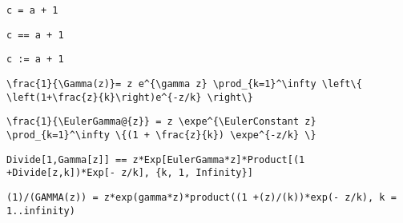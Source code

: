 \newsavebox\BOST
\begin{lrbox}{\BOST}
 \begin{minipage}[t]{0.82\textwidth}
  \lstinline[language={[latex]TeX},mathescape,breaklines=true]"c = a + 1"
 \end{minipage}
\end{lrbox}
\newsavebox\BOMM
\begin{lrbox}{\BOMM}
 \begin{minipage}[t]{0.82\textwidth}
  \lstinline[language={[latex]TeX},mathescape,breaklines=true]"c == a + 1"
 \end{minipage}
\end{lrbox}
\newsavebox\BOMA
\begin{lrbox}{\BOMA}
 \begin{minipage}[t]{0.82\textwidth}
  \lstinline[language={[latex]TeX},mathescape,breaklines=true]"c := a + 1"
 \end{minipage}
\end{lrbox}
\newsavebox\BPT
\begin{lrbox}{\BPT}
 \begin{minipage}[t]{0.82\textwidth}
  \lstinline[language={[latex]TeX},mathescape,breaklines=true]"\frac{1}{\Gamma(z)}= z e^{\gamma z} \prod_{k=1}^\infty \left\{ \left(1+\frac{z}{k}\right)e^{-z/k} \right\}"
 \end{minipage}
\end{lrbox}
\newsavebox\BPST
\begin{lrbox}{\BPST}
 \begin{minipage}[t]{0.82\textwidth}
  \lstinline[language={[latex]TeX},mathescape,breaklines=true]"\frac{1}{\EulerGamma@{z}} = z \expe^{\EulerConstant z} \prod_{k=1}^\infty \{(1 + \frac{z}{k}) \expe^{-z/k} \}"
 \end{minipage}
\end{lrbox}
\newsavebox\BPMM
\begin{lrbox}{\BPMM}
 \begin{minipage}[t]{0.82\textwidth}
  \lstinline[language={[latex]TeX},mathescape,breaklines=true]"Divide[1,Gamma[z]] == z*Exp[EulerGamma*z]*Product[(1 +Divide[z,k])*Exp[- z/k], {k, 1, Infinity}]"
 \end{minipage}
\end{lrbox}
\newsavebox\BPMA
\begin{lrbox}{\BPMA}
 \begin{minipage}[t]{0.82\textwidth}
  \lstinline[language={[latex]TeX},mathescape,breaklines=true]"(1)/(GAMMA(z)) = z*exp(gamma*z)*product((1 +(z)/(k))*exp(- z/k), k = 1..infinity)"
 \end{minipage}
\end{lrbox}
